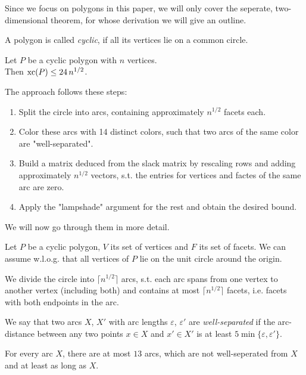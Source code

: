 Since we focus on polygons in this paper, we will only cover the seperate, two-dimensional theorem, for whose derivation we will give an outline.

\begin{definition}
  A polygon is called \emph{cyclic}, if all its vertices lie on a common circle.
\end{definition}

\begin{theorem}
  Let $P$ be a cyclic polygon with $n$ vertices.\\
  Then $\operatorname{xc}(P) \leq 24\,n^{1/2}$.
\end{theorem}

The approach follows these steps:

\begin{enumerate}
  \item Split the circle into arcs, containing approximately $n^{1/2}$ facets each.
  \item Color these arcs with 14 distinct colors, such that two arcs of the same color are "well-separated".
  \item Build a matrix deduced from the slack matrix by rescaling rows and adding approximately $n^{1/2}$ vectors, s.t. the entries for vertices and factes of the same arc are zero.
  \item Apply the "lampshade" argument for the rest and obtain the desired bound.
\end{enumerate}

We will now go through them in more detail.

Let $P$ be a cyclic polygon, $V$ its set of vertices and $F$ its set of facets. We can assume w.l.o.g. that all vertices of $P$ lie on the unit circle around the origin.

We divide the circle into $\lceil n^{1/2} \rceil$ arcs, s.t. each arc spans from one vertex to another vertex (including both) and contains at most $\lceil n^{1/2} \rceil$ facets, i.e. facets with both endpoints in the arc.

\begin{definition}
  We say that two arcs $X$, $X'$ with arc lengths $\varepsilon$, $\varepsilon'$ are \emph{well-separated} if the arc-distance between any two points $x \in X$ and $x' \in X'$ is at least $5 \min\{\varepsilon, \varepsilon'\}$.
\end{definition}

\begin{lemma}
  For every arc $X$, there are at most $13$ arcs, which are not well-seperated from $X$ and at least as long as $X$.
\end{lemma}

